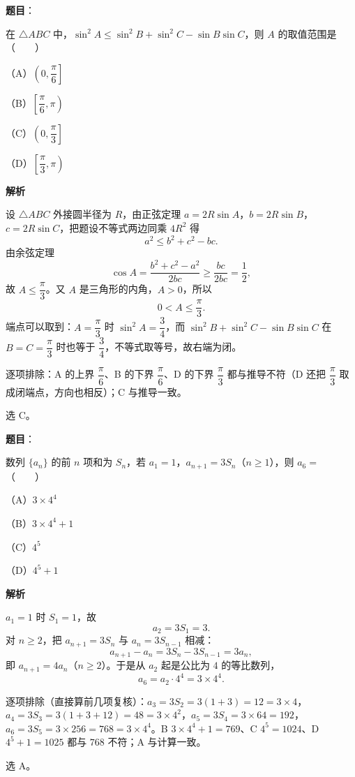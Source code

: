\begin{answer}

\textbf{题目}：

在 $\triangle ABC$ 中，$\sin^2A\leqslant\sin^2B+\sin^2C-\sin B\sin C$，则 $A$ 的取值范围是\mbox{（　　）}

（A）$\left(0,\dfrac{\pi}{6}\right]$

（B）$\left[\dfrac{\pi}{6},\pi\right)$

（C）$\left(0,\dfrac{\pi}{3}\right]$

（D）$\left[\dfrac{\pi}{3},\pi\right)$

\textbf{解析}

设 $\triangle ABC$ 外接圆半径为 $R$，由正弦定理 $a=2R\sin A$，$b=2R\sin B$，$c=2R\sin C$，把题设不等式两边同乘 $4R^2$ 得
\nopagebreak[4]
\[
a^2\leqslant b^2+c^2-bc.
\]
由余弦定理
\nopagebreak[4]
\[
\cos A=\frac{b^2+c^2-a^2}{2bc}\geqslant\frac{bc}{2bc}=\frac12,
\]
故 $A\leqslant\dfrac{\pi}{3}$。又 $A$ 是三角形的内角，$A>0$，所以
\nopagebreak[4]
\[
0<A\leqslant\frac{\pi}{3}.
\]
端点可以取到：$A=\dfrac{\pi}{3}$ 时 $\sin^2A=\dfrac34$，而 $\sin^2B+\sin^2C-\sin B\sin C$ 在 $B=C=\dfrac{\pi}{3}$ 时也等于 $\dfrac34$，不等式取等号，故右端为闭。

逐项排除：A 的上界 $\dfrac{\pi}{6}$、B 的下界 $\dfrac{\pi}{6}$、D 的下界 $\dfrac{\pi}{3}$ 都与推导不符（D 还把 $\dfrac{\pi}{3}$ 取成闭端点，方向也相反）；C 与推导一致。

选 C。


\end{answer}
\begin{answer}

\textbf{题目}：

数列 $\{a_n\}$ 的前 $n$ 项和为 $S_n$，若 $a_1=1$，$a_{n+1}=3S_n$（$n\geqslant1$），则 $a_6=$\mbox{（　　）}

（A）$3\times4^4$

（B）$3\times4^4+1$

（C）$4^5$

（D）$4^5+1$

\textbf{解析}

$a_1=1$ 时 $S_1=1$，故
\nopagebreak[4]
\[
a_2=3S_1=3.
\]
对 $n\geqslant2$，把 $a_{n+1}=3S_n$ 与 $a_n=3S_{n-1}$ 相减：
\nopagebreak[4]
\[
a_{n+1}-a_n=3S_n-3S_{n-1}=3a_n,
\]
即 $a_{n+1}=4a_n$（$n\geqslant2$）。于是从 $a_2$ 起是公比为 $4$ 的等比数列，
\nopagebreak[4]
\[
a_6=a_2\cdot4^{4}=3\times4^4.
\]

逐项排除（直接算前几项复核）：$a_3=3S_2=3(1+3)=12=3\times4$，$a_4=3S_3=3(1+3+12)=48=3\times4^2$，$a_5=3S_4=3\times64=192$，$a_6=3S_5=3\times256=768=3\times4^4$。B $3\times4^4+1=769$、C $4^5=1024$、D $4^5+1=1025$ 都与 $768$ 不符；A 与计算一致。

选 A。


\end{answer}
